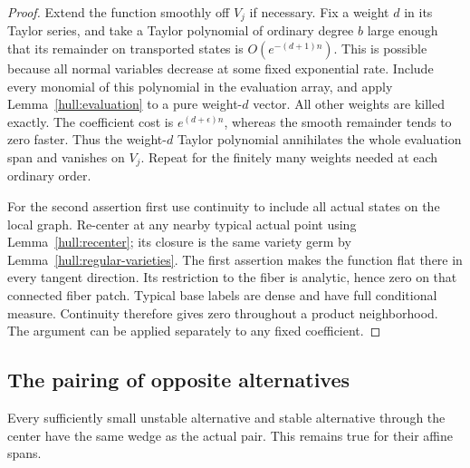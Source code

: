\begin{proof}
Extend the function smoothly off $V_j$ if necessary. Fix a weight $d$
in its Taylor series, and take a Taylor polynomial of ordinary degree
$b$ large enough that its remainder on transported states is
$O(e^{-(d+1)n})$. This is possible because all normal variables decrease
at some fixed exponential rate. Include every monomial of this
polynomial in the evaluation array, and apply
Lemma~\ref{hull:evaluation} to a pure weight-$d$ vector. All other
weights are killed exactly. The coefficient cost is
$e^{(d+\epsilon)n}$, whereas the smooth remainder tends to zero faster.
Thus the weight-$d$ Taylor polynomial annihilates the whole evaluation
span and vanishes on $V_j$. Repeat for the finitely many weights needed
at each ordinary order.

For the second assertion first use continuity to include all actual
states on the local graph. Re-center at any nearby typical actual
point using Lemma~\ref{hull:recenter}; its closure is the same variety
germ by Lemma~\ref{hull:regular-varieties}. The first assertion makes
the function flat there in every tangent direction. Its restriction to
the fiber is analytic, hence zero on that connected fiber patch. Typical
base labels are dense and have full conditional measure. Continuity
therefore gives zero throughout a product neighborhood. The argument
can be applied separately to any fixed coefficient.
\end{proof}

\subsection{The pairing of opposite alternatives}

\begin{proposition}\label{hull:pairing}
Every sufficiently small unstable alternative and stable alternative
through the center have the same wedge as the actual pair. This remains
true for their affine spans.
\end{proposition}


